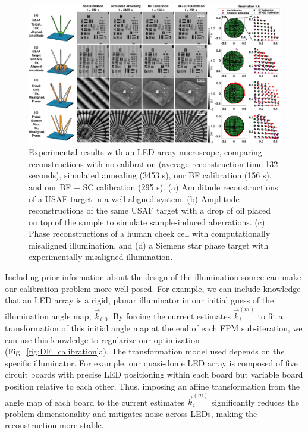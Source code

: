 \begin{figure} [htb]
	\centering
	\includegraphics[width=1\textwidth]{figures/fig_selfcal_fpm_mosaic.pdf}
	\caption{Experimental results with an LED array microscope, comparing reconstructions with no calibration (average reconstruction time 132 seconds), simulated annealing (3453 s), our BF calibration (156 s), and our BF + SC calibration (295 s). (a) Amplitude reconstructions of a USAF target in a well-aligned system. (b) Amplitude reconstructions of the same USAF target with a drop of oil placed on top of the sample to simulate sample-induced aberrations. (c) Phase reconstructions of a human cheek cell with computationally misaligned illumination, and (d) a Siemens star phase target with experimentally misaligned illumination.
		}
	\label{Fig:results}
\end{figure}



Including prior information about the design of the illumination source can make our calibration problem more well-posed. For example, we can include knowledge that an LED array is a rigid, planar illuminator in our initial guess of the illumination angle map, $\vec{k}_{i,0}$. By forcing the current estimates $\vec{k}_i^{(m)}$ to fit a transformation of this initial angle map at the end of each FPM sub-iteration, we can use this knowledge to regularize our optimization (Fig.~\ref{fig:DF_calibration}a). The transformation model used depends on the specific illuminator. For example, our quasi-dome LED array is composed of five circuit boards with precise LED positioning within each board but variable board position relative to each other. Thus, imposing an affine transformation from the angle map of each board to the current estimates $\vec{k}_i^{(m)}$ significantly reduces the problem dimensionality and mitigates noise across LEDs, making the reconstruction more stable.

